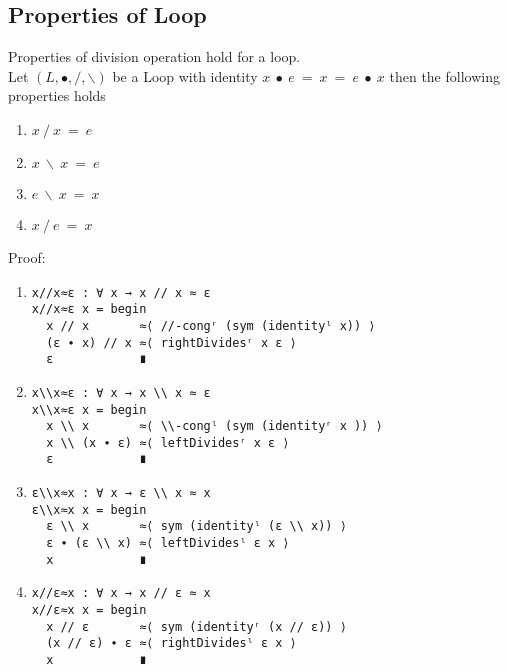 \subsection{Properties of Loop}
Properties of division operation hold for a loop.\\
Let $(L, ∙, /, \backslash)$ be a Loop with identity $x\ ∙\ e\ =\ x\ =\ e\ ∙\ x$
then the following properties holds 
\begin{enumerate}
\item \(x \ /\  x\ =\ e\) 
\item \( x\ \backslash \ x\ =\ e\)
\item \(e\ \backslash \ x\ =\ x\) 
\item \(x\ /\ e\ =\ x\) 
\end{enumerate}
Proof:
\begin{enumerate}
\item 
\begin{verbatim}
x//x≈ε : ∀ x → x // x ≈ ε
x//x≈ε x = begin
  x // x       ≈⟨ //-congʳ (sym (identityˡ x)) ⟩
  (ε ∙ x) // x ≈⟨ rightDividesʳ x ε ⟩
  ε            ∎
\end{verbatim}
\item
\begin{verbatim}
x\\x≈ε : ∀ x → x \\ x ≈ ε
x\\x≈ε x = begin
  x \\ x       ≈⟨ \\-congˡ (sym (identityʳ x )) ⟩
  x \\ (x ∙ ε) ≈⟨ leftDividesʳ x ε ⟩
  ε            ∎
\end{verbatim}
\item
\begin{verbatim}
ε\\x≈x : ∀ x → ε \\ x ≈ x
ε\\x≈x x = begin
  ε \\ x       ≈⟨ sym (identityˡ (ε \\ x)) ⟩
  ε ∙ (ε \\ x) ≈⟨ leftDividesˡ ε x ⟩
  x            ∎
\end{verbatim}
\item
\begin{verbatim}
x//ε≈x : ∀ x → x // ε ≈ x
x//ε≈x x = begin
  x // ε       ≈⟨ sym (identityʳ (x // ε)) ⟩
  (x // ε) ∙ ε ≈⟨ rightDividesˡ ε x ⟩
  x            ∎
\end{verbatim}
\end{enumerate}
